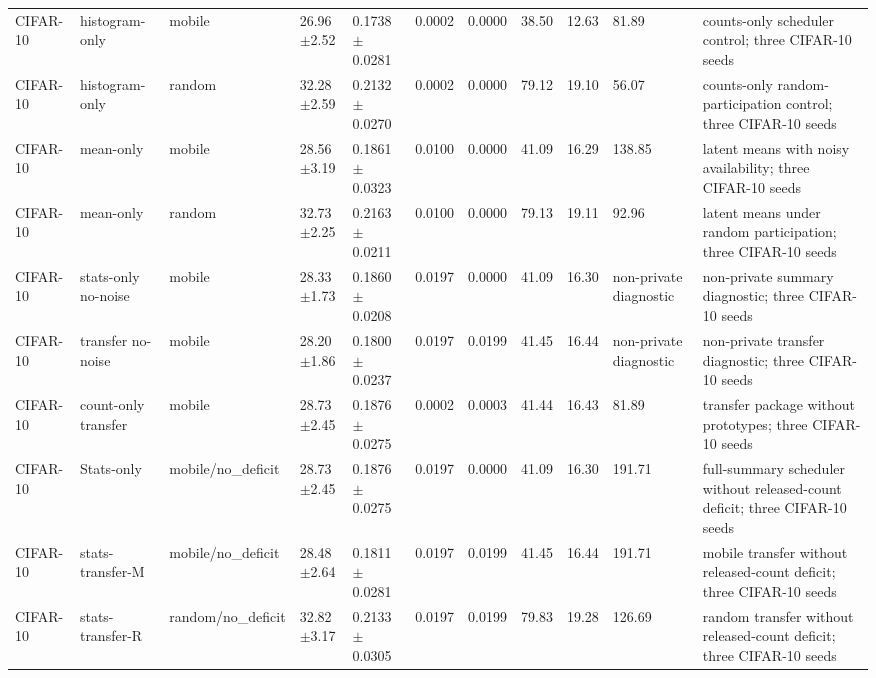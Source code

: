 \begin{table}[t]
{\begin{tabular}{lllllllllll}
CIFAR-10 & histogram-only & mobile & 26.96$\pm$2.52 & 0.1738$\pm$0.0281 & 0.0002 & 0.0000 & 38.50 & 12.63 & 81.89 & counts-only scheduler control; three CIFAR-10 seeds \\
CIFAR-10 & histogram-only & random & 32.28$\pm$2.59 & 0.2132$\pm$0.0270 & 0.0002 & 0.0000 & 79.12 & 19.10 & 56.07 & counts-only random-participation control; three CIFAR-10 seeds \\
CIFAR-10 & mean-only & mobile & 28.56$\pm$3.19 & 0.1861$\pm$0.0323 & 0.0100 & 0.0000 & 41.09 & 16.29 & 138.85 & latent means with noisy availability; three CIFAR-10 seeds \\
CIFAR-10 & mean-only & random & 32.73$\pm$2.25 & 0.2163$\pm$0.0211 & 0.0100 & 0.0000 & 79.13 & 19.11 & 92.96 & latent means under random participation; three CIFAR-10 seeds \\
CIFAR-10 & stats-only no-noise & mobile & 28.33$\pm$1.73 & 0.1860$\pm$0.0208 & 0.0197 & 0.0000 & 41.09 & 16.30 & non-private diagnostic & non-private summary diagnostic; three CIFAR-10 seeds \\
CIFAR-10 & transfer no-noise & mobile & 28.20$\pm$1.86 & 0.1800$\pm$0.0237 & 0.0197 & 0.0199 & 41.45 & 16.44 & non-private diagnostic & non-private transfer diagnostic; three CIFAR-10 seeds \\
CIFAR-10 & count-only transfer & mobile & 28.73$\pm$2.45 & 0.1876$\pm$0.0275 & 0.0002 & 0.0003 & 41.44 & 16.43 & 81.89 & transfer package without prototypes; three CIFAR-10 seeds \\
CIFAR-10 & Stats-only & mobile/no\_deficit & 28.73$\pm$2.45 & 0.1876$\pm$0.0275 & 0.0197 & 0.0000 & 41.09 & 16.30 & 191.71 & full-summary scheduler without released-count deficit; three CIFAR-10 seeds \\
CIFAR-10 & stats-transfer-M & mobile/no\_deficit & 28.48$\pm$2.64 & 0.1811$\pm$0.0281 & 0.0197 & 0.0199 & 41.45 & 16.44 & 191.71 & mobile transfer without released-count deficit; three CIFAR-10 seeds \\
CIFAR-10 & stats-transfer-R & random/no\_deficit & 32.82$\pm$3.17 & 0.2133$\pm$0.0305 & 0.0197 & 0.0199 & 79.83 & 19.28 & 126.69 & random transfer without released-count deficit; three CIFAR-10 seeds \\
\bottomrule
\end{tabular}
}
\end{table}

